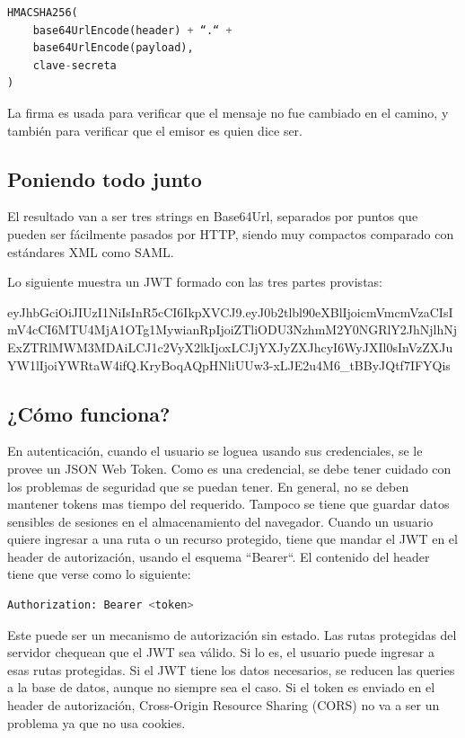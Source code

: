 \begin{lstlisting}[language=Python]
HMACSHA256(
    base64UrlEncode(header) + “.“ +
    base64UrlEncode(payload),
    clave-secreta
)
\end{lstlisting}
La firma es usada para verificar que el mensaje no fue cambiado en el camino, y también para verificar que el emisor es quien dice ser.

\subsection[Poniendo todo junto]{Poniendo todo junto}

El resultado van a ser tres strings en Base64Url, separados por puntos que pueden ser fácilmente pasados por HTTP, siendo muy compactos comparado con estándares XML como SAML.

Lo siguiente muestra un JWT formado con las tres partes provistas:


eyJhbGciOiJIUzI1NiIsInR5cCI6IkpXVCJ9.\break eyJ0b2tlbl90eXBlIjoicmVmcmVzaCIsImV4cCI6MTU4MjA1OTg1MywianRpIj\break oiZTliODU3NzhmM2Y0NGRlY2JhNjlhNjExZTRlMWM3MDAiLCJ1c2VyX2lkIj\break oxLCJjYXJyZXJhcyI6WyJXIl0sInVzZXJuYW1lIjoiYWRtaW4ifQ.\break KryBoqAQpHNliUUw3-xLJE2u4M6\_tBByJQtf7IFYQis



\subsection[¿Cómo funciona?]{¿Cómo funciona?}

En autenticación, cuando el usuario se loguea usando sus credenciales, se le provee un JSON Web Token. Como es una credencial, se debe tener cuidado con los problemas de seguridad que se puedan tener. En general, no se deben mantener tokens mas tiempo del requerido. Tampoco se tiene que guardar datos sensibles de sesiones en el almacenamiento del navegador.
Cuando un usuario quiere ingresar a una ruta o un recurso protegido, tiene que mandar el JWT en el header de autorización, usando el esquema “Bearer“. El contenido del header tiene que verse como lo siguiente:
\begin{lstlisting}[language=Python]
Authorization: Bearer <token>
\end{lstlisting}

Este puede ser un mecanismo de autorización sin estado. Las rutas protegidas del servidor chequean que el JWT sea válido. Si lo es, el usuario puede ingresar a esas rutas protegidas. Si el JWT tiene los datos necesarios, se reducen las queries a la base de datos, aunque no siempre sea el caso.
Si el token es enviado en el header de autorización, Cross-Origin Resource Sharing (CORS) no va a ser un problema ya que no usa cookies.


